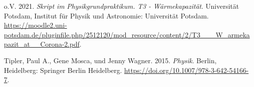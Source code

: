 \documentclass[class=article, crop=false]{standalone}
\newlength{\cslhangindent}
\newlength{\cslentryspacingunit} %
\newenvironment{CSLReferences}[2] %
 {%
  \setlength{\parindent}{0pt}
  \ifodd #1
  \let\oldpar\par
  \def\par{\hangindent=\cslhangindent\oldpar}
  \fi
  \setlength{\parskip}{#2\cslentryspacingunit}
 }%
 {}
\begin{document}
\hypertarget{refs}{}
\begin{CSLReferences}{1}{0}
\leavevmode{}%
o.V. 2021. \emph{Skript im Physikgrundpraktikum. T3 - Wärmekapazität}.
Universität Potsdam, Institut für Physik und Astronomie: {Universität
Potsdam}.
\url{https://moodle2.uni-potsdam.de/pluginfile.php/2512120/mod_resource/content/2/T3___W_armekapazit_at__Corona-2.pdf}.

\leavevmode{}%
Tipler, Paul A., Gene Mosca, und Jenny Wagner. 2015. \emph{Physik}.
Berlin, Heidelberg: {Springer Berlin Heidelberg}.
\url{https://doi.org/10.1007/978-3-642-54166-7}.

\end{CSLReferences}
\end{document}
